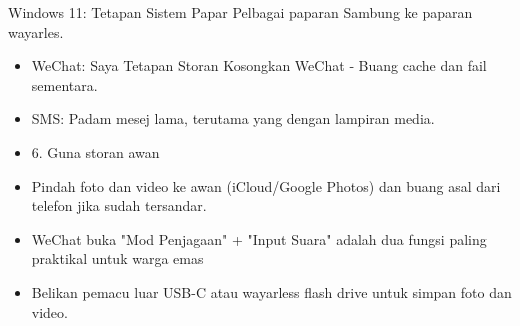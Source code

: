 \begin{tcbsummary}{Windows 11: Tetapan Sistem Papar Pelbagai paparan Sambung ke paparan wayarles.}
\begin{itemize}
  \item WeChat: Saya Tetapan Storan Kosongkan WeChat ‑ Buang cache dan fail sementara.
  \item SMS: Padam mesej lama, terutama yang dengan lampiran media.
  \item 6. Guna storan awan
  \item Pindah foto dan video ke awan (iCloud/Google Photos) dan buang asal dari telefon jika sudah tersandar.
  \item WeChat buka "Mod Penjagaan" + "Input Suara" adalah dua fungsi paling praktikal untuk warga emas
  \item Belikan pemacu luar USB-C atau wayarless flash drive untuk simpan foto dan video.
\end{itemize}

\end{tcbsummary}
